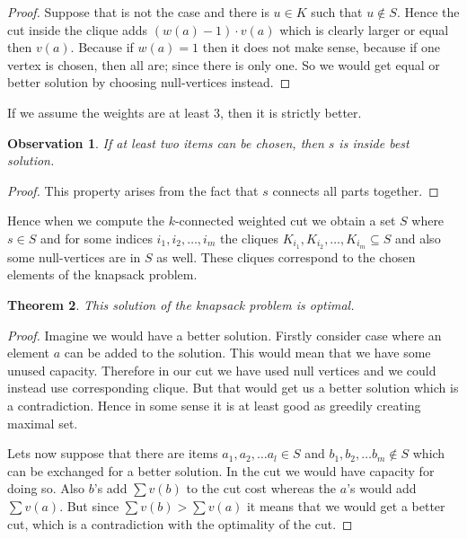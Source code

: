 \documentclass{article}
\theoremstyle{plain}
\newtheorem{thm}{Theorem}
\newtheorem{observ}[thm]{Observation}
\theoremstyle{plain}
\theoremstyle{remark}
\begin{document}
	\begin{proof}
		Suppose that is not the case and there is $u \in K$ such that $u \notin S$. Hence the cut inside the clique adds $(w(a)-1) \cdot v(a)$ which is clearly larger or equal then $v(a)$. Because if $w(a) = 1$ then it does not make sense, because if one vertex is chosen, then all are; since there is only one. So we would get equal or better solution by choosing null-vertices instead.
	\end{proof}

	If we assume the weights are at least 3, then it is strictly better.
	
	\begin{observ}
		If at least two items can be chosen, then $s$ is inside best solution.
	\end{observ}

	\begin{proof}
		This property arises from the fact that $s$ connects all parts together.
	\end{proof}

	Hence when we compute the $k$-connected weighted cut we obtain a set $S$ where $s \in S$ and for some indices $i_1, i_2, \dots, i_m$ the cliques $K_{i_1}, K_{i_2}, \dots, K_{i_m} \subseteq S$ and also some null-vertices are in $S$ as well. These cliques correspond to the chosen elements of the knapsack problem.
	
	\begin{thm}
		This solution of the knapsack problem is optimal.
	\end{thm}

	\begin{proof}
		Imagine we would have a better solution. Firstly consider case where an element $a$ can be added to the solution. This would mean that we have some unused capacity. Therefore in our cut we have used null vertices and we could instead use corresponding clique. But that would get us a better solution which is a contradiction. Hence in some sense it is at least good as greedily creating maximal set.
		
		Lets now suppose that there are items $a_1, a_2, \dots a_l \in S$ and $b_1, b_2, \dots b_m \notin S$ which can be exchanged for a better solution. In the cut we would have capacity for doing so. Also $b$'s add $\sum v(b)$ to the cut cost whereas the $a$'s would add $\sum v(a)$. But since $\sum v(b) > \sum v(a)$ it means that we would get a better cut, which is a contradiction with the optimality of the cut.
	\end{proof}
\end{document}
